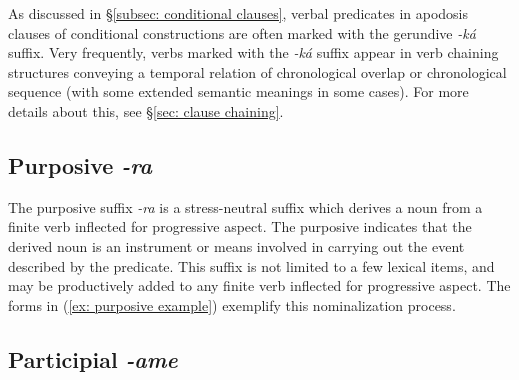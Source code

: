 As discussed in §\ref{subsec: conditional clauses}, verbal predicates in apodosis clauses of conditional constructions are often marked with the gerundive \textit{-ká} suffix. Very frequently, verbs marked with the \textit{-ká} suffix appear in verb chaining structures conveying a temporal relation of chronological overlap or chronological sequence (with some extended semantic meanings in some cases). For more details about this, see §\ref{sec: clause chaining}.

\subsection{Purposive \textit{-ra}}
\label{subsec: purposive}

The purposive suffix \textit{-ra} is a stress-neutral suffix which derives a noun from a finite verb inflected for progressive aspect. The purposive indicates that the derived noun is an instrument or means involved in carrying out the event described by the predicate. This suffix is not limited to a few lexical items, and may be productively added to any finite verb inflected for progressive aspect. The forms in (\ref{ex: purposive example}) exemplify this nominalization process.

\ea\label{ex: purposive example}

    \z
\z

\subsection{Participial \textit{-ame}}
\label{subsec: participial}

